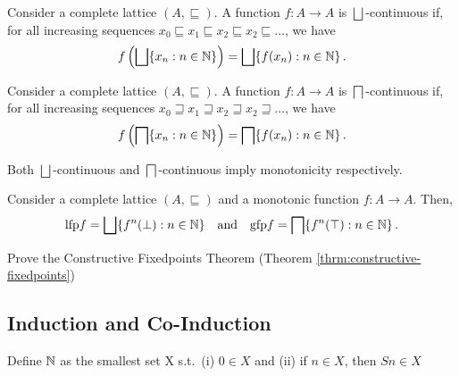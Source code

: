 \begin{definition}
    Consider a complete lattice $(A, \sqsubseteq)$.
	A function $f \colon A \to A$ is $\bigsqcup$-continuous if, for all increasing sequences $x_0 \sqsubseteq x_1 \sqsubseteq x_2 \sqsubseteq x_2 \sqsubseteq \ldots$, we have
    \begin{align*}
        f \left( \bigsqcup \{ x_n : n \in \mathbb{N} \} \right) = \bigsqcup \{ f(x_n) : n \in \mathbb{N} \} \,.
    \end{align*}
\end{definition}


\begin{definition}
    Consider a complete lattice $(A, \sqsubseteq)$.
	A function $f \colon A \to A$ is $\bigsqcap$-continuous if, for all increasing sequences $x_0 \sqsupseteq x_1 \sqsupseteq x_2 \sqsupseteq x_2 \sqsupseteq \ldots$, we have
 \begin{align*}
     	f \left( \bigsqcap \{ x_n : n \in \mathbb{N} \} \right) = \bigsqcap \{ f(x_n) : n \in \mathbb{N} \} \,.
 \end{align*}
\end{definition}

\begin{lemma}
    Both $\bigsqcup$-continuous and $\bigsqcap$-continuous imply monotonicity respectively. 
\end{lemma}



\begin{theorem}
\label{thrm:constructive-fixedpoints}
    Consider a complete lattice $(A, \sqsubseteq)$ and a monotonic function $f \colon A \to A$.
	Then, 
	\begin{align*}
		\mathrm{lfp} f 
			= \bigsqcup \{ f^n(\perp) : n \in \mathbb{N} \}  \quad \text{and} \quad 
		\mathrm{gfp} f 
			= \bigsqcap \{ f^n(\top) : n \in \mathbb{N} \} \,.
	\end{align*}
\end{theorem}


\begin{exercise}
    Prove the Constructive Fixedpoints Theorem (Theorem \ref{thrm:constructive-fixedpoints})
\end{exercise}
	

\subsection{Induction and Co-Induction}

\begin{definition}
\label{def:natural-numbers}
    Define $\mathbb{N}$ as the smallest set X s.t.\ (i) $0 \in X$ and (ii) if $n \in X$, then $S n \in X$
\end{definition}

